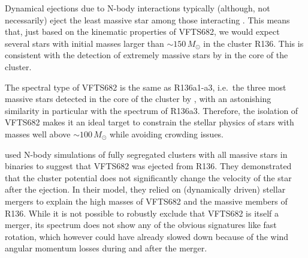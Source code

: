 \documentclass[a4paper,fleqn,usenatbib]{mnras}
\newcommand{\kms}{{\,\mathrm{km\ s^{-1}}}}
\begin{document}
Dynamical ejections due to N-body interactions typically (although, not necessarily) eject the least
massive star among those interacting \cite[e.g.,][]{banerjee:12}. This means that, just
based on the kinematic properties of VFTS682, we would expect several
stars with initial masses larger than $\sim$$150\,M_\odot$ in the
cluster R136.
This is consistent with the detection
of extremely massive stars by \cite{crowther:10} in the core of the
cluster. %

The spectral type of VFTS682
\citep[WNh5,][]{bestenlehner:11} is the same as R136a1-a3, i.e.~the
three most massive stars detected in the core of the cluster by
\cite{dekoter:97,crowther:10,crowther:16}, with an astonishing similarity in particular with
the spectrum of R136a3. Therefore, the isolation of
VFTS682 makes it an ideal target to constrain the stellar physics of
stars with masses well above $\sim$$100\,M_\odot$ while avoiding
crowding issues. %

\citet{banerjee:12} used N-body simulations of fully segregated
clusters with all massive stars in binaries to suggest that VFTS682
was ejected from R136. They
demonstrated that the cluster potential does not significantly change
the velocity of the star after the ejection. In their
model, they relied on (dynamically driven) stellar mergers to explain the high masses of
VFTS682 and the massive members of R136. While it is not possible to
robustly exclude that VFTS682 is itself a merger, its spectrum does not show any of the obvious signatures
like fast rotation, which however could have already slowed down
because of the wind angular momentum losses during and after the
merger.
\end{document}
